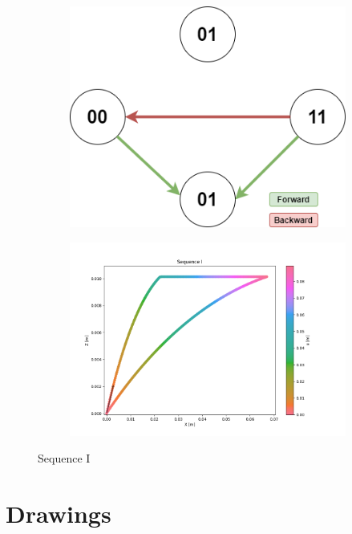        \begin{figure}[h]
            \begin{subfigure}{.3\textwidth}
            \includegraphics[width=\textwidth]{images/Sequences-Sequence I.png}
            \end{subfigure}%
            \begin{subfigure}{.7\textwidth}
            \includegraphics[width=\textwidth]{images/I.png}
            \end{subfigure}
            \caption{Sequence I}
        \end{figure}        
        
    \section{Drawings}
        
        